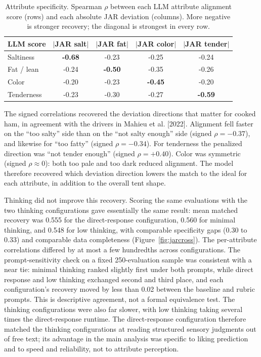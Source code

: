 \documentclass[11pt]{article}
\begin{document}
\begin{table}[H]
\centering
\caption{Attribute specificity. Spearman $\rho$ between each LLM attribute alignment score (rows) and each absolute JAR deviation (columns). More negative is stronger recovery; the diagonal is strongest in every row.}
\label{tab:jarspec}
\begin{tabular}{lcccc}
\toprule
LLM score & $|$JAR salt$|$ & $|$JAR fat$|$ & $|$JAR color$|$ & $|$JAR tender$|$ \\
\midrule
Saltiness   & \textbf{-0.68} & -0.23 & -0.25 & -0.24 \\
Fat / lean  & -0.24 & \textbf{-0.50} & -0.35 & -0.26 \\
Color       & -0.20 & -0.23 & \textbf{-0.45} & -0.20 \\
Tenderness  & -0.23 & -0.30 & -0.27 & \textbf{-0.59} \\
\bottomrule
\end{tabular}
\end{table}

The signed correlations recovered the deviation directions that matter for
cooked ham, in agreement with the drivers in Mahieu et al. [2022]. Alignment
fell faster on the ``too salty'' side than on the ``not salty enough'' side
(signed $\rho = -0.37$), and likewise for ``too fatty'' (signed
$\rho = -0.34$). For tenderness the penalized direction was ``not tender
enough'' (signed $\rho = +0.40$). Color was symmetric (signed
$\rho \approx 0$): both too pale and too dark reduced alignment. The model
therefore recovered which deviation direction lowers the match to the ideal
for each attribute, in addition to the overall tent shape.

Thinking did not improve this recovery. Scoring the same evaluations with the
two thinking configurations gave essentially the same result:
mean matched recovery was 0.555 for the direct-response configuration, 0.560
for minimal thinking, and 0.548 for low thinking, with comparable specificity
gaps (0.30 to 0.33) and comparable data completeness
(Figure~\ref{fig:jarcross}). The per-attribute correlations differed by at
most a few hundredths across configurations. The prompt-sensitivity check on a fixed 250-evaluation sample was consistent
with a near tie: minimal thinking ranked slightly first under both prompts,
while direct response and low thinking exchanged second and third place, and
each configuration's recovery moved by less than 0.02 between the baseline and
rubric prompts. This is descriptive agreement, not a formal equivalence test. The thinking
configurations were also far slower, with low thinking taking several times
the direct-response runtime. The direct-response configuration therefore
matched the thinking configurations at reading structured sensory judgments
out of free text; its advantage in the main analysis was specific to liking
prediction and to speed and reliability, not to attribute perception.
\end{document}
